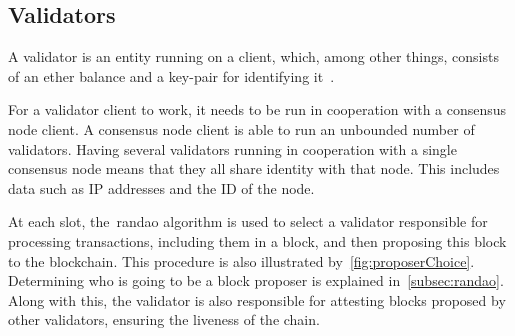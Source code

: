 %
%

\subsection{Validators}\label{subsec:validator}
A validator is an entity running on a client,
which, among other things, consists of an ether balance and a key-pair for identifying it~\cite{Staking}.

For a validator client to work, it needs to be run in cooperation with a consensus node client.
A consensus node client is able to run an unbounded number of validators.
Having several validators running in cooperation with a single consensus node means that they all share identity with that node.
This includes data such as IP addresses and the ID of the node.

At each slot, the~\gls{randao} algorithm is used to select a validator responsible for processing transactions,
including them in a block,
and then proposing this block to the blockchain.
This procedure is also illustrated by~\autoref{fig:proposerChoice}.
Determining who is going to be a block proposer is explained in~\autoref{subsec:randao}.
Along with this, the validator is also responsible for attesting blocks proposed by other validators,
ensuring the liveness of the chain.


